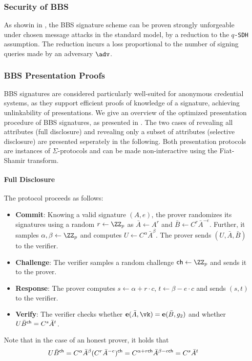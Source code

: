 \subsubsection{Security of BBS} \label{sec:prelims:bbs_sec}
As showin in \cite{DBLP:conf/eurocrypt/TessaroZ23a}, the BBS signature scheme can be proven strongly unforgeable under chosen message attacks in the standard model, by a reduction to the \texttt{$q$-SDH} assumption. The reduction incurs a loss proportional to the number of signing queries made by an adversary $\adv$.

\subsubsection{BBS Presentation Proofs} \label{sec:prelims:bbs_pres}
BBS signatures are considered particularly well-suited for anonymous credential systems, as they support efficient proofs of knowledge of a signature, achieving unlinkability of presentations. We give an overview of the optimized presentation procedure of BBS signatures, as presented in \cite{DBLP:conf/eurocrypt/TessaroZ23a}. The two cases of revealing all attributes (full disclosure) and revealing only a subset of attributes (selective disclosure) are presented seperately in the following. Both presentation protocols are instances of $\Sigma$-protocols and can be made non-interactive using the Fiat-Shamir transform.

\paragraph{Full Disclosure}{
    The protocol proceeds as follows: 
    \begin{itemize}
        \item \textbf{Commit}: Knowing a valid signature $(A,e)$, the prover randomizes its signatures using a random $r\gets \ZZ_p$ as $\bar{A} \gets A^r$ and $\bar{B} \gets C^r \bar{A}^{-e}$. Further, it samples $\alpha,\beta\gets \ZZ_p$ and computes $U \gets C^{\alpha} \bar{A}^{\beta}$. The prover sends $(U,\bar{A},\bar{B})$ to the verifier.
        \item \textbf{Challenge}: The verifier samples a random challenge $\chall\gets \ZZ_p$ and sends it to the prover.
        \item \textbf{Response}: The prover computes $s\gets \alpha +r\cdot c$, $t\gets\beta-e\cdot c$ and sends $(s,t)$ to the verifier.
        \item \textbf{Verify}: The verifier checks whether $\pairing(\bar{A},\vk) = \pairing(\bar{B},g_2)$ and whether $U \bar{B}^{\mathsf{ch}} = C^s \bar{A}^t$.
    \end{itemize}
    Note that in the case of an honest prover, it holds that 
    \begin{align*}
        U \bar{B}^{\mathsf{ch}} 
        &= C^{\alpha} \bar{A}^{\beta} (C^r \bar{A}^{-e})^{\mathsf{ch}} 
        = C^{\alpha + r \mathsf{ch}} \bar{A}^{\beta - e \mathsf{ch}} 
        = C^s \bar{A}^t
    \end{align*}
}

